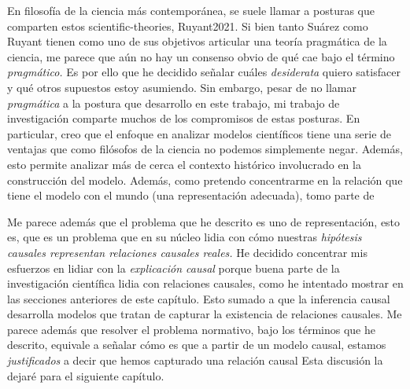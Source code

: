 {{En filosofía de la ciencia más contemporánea, se suele
llamar  a posturas que comparten estos
scientific-theories, Ruyant2021}. Si bien tanto Suárez como
Ruyant tienen como uno de sus objetivos articular una teoría
pragmática de la ciencia, me parece que aún no hay un
consenso obvio de qué cae bajo el término \emph{pragmático.}
Es por ello que he decidido señalar cuáles \emph{desiderata} quiero
satisfacer y qué otros supuestos estoy asumiendo. Sin embargo, pesar de no llamar \emph{pragmática} a la postura que
desarrollo en este trabajo, mi trabajo de investigación
comparte muchos de los compromisos de estas posturas. En
particular, creo que el enfoque en analizar modelos
científicos tiene una serie de ventajas que como filósofos
de la ciencia no podemos simplemente negar. Además, esto
permite analizar más de cerca el contexto histórico
involucrado en la construcción del modelo. Además, como
pretendo concentrarme en la relación que tiene el modelo con
el mundo (una representación adecuada), tomo parte de

Me parece además que el problema que he descrito es
uno de representación, esto es, que es un problema que en su
núcleo lidia con cómo nuestras \emph{hipótesis causales
representan relaciones causales reales.} He decidido
concentrar mis esfuerzos en lidiar con la \emph{explicación
causal} porque buena parte de la investigación científica
lidia con relaciones causales, como he intentado mostrar en
las secciones anteriores de este capítulo. Esto sumado a que la
inferencia causal desarrolla modelos que tratan de capturar
la existencia de relaciones causales. Me parece además
que resolver el problema normativo, bajo los términos
que he descrito, equivale a señalar cómo es que
a partir de un modelo causal, estamos \emph{justificados} a
decir que hemos capturado una relación causal 
Esta discusión la dejaré para el siguiente capítulo.

}
